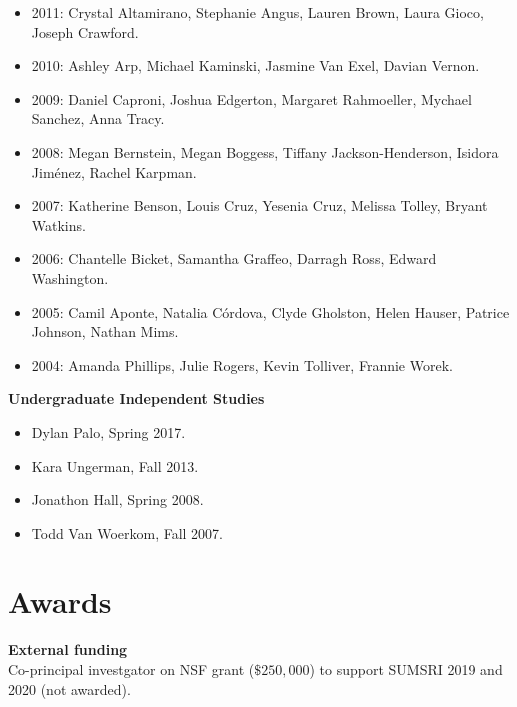 \documentclass[overlapped,line,letterpaper]{res}
\begin{document}
\begin{resume}
\begin{itemize}
\item
2011: Crystal Altamirano, Stephanie Angus, Lauren Brown, Laura Gioco, Joseph 
Crawford.

\item
2010: Ashley Arp, Michael Kaminski, Jasmine Van Exel, Davian Vernon.

\item
2009: Daniel Caproni, Joshua Edgerton, Margaret Rahmoeller, Mychael 
Sanchez, Anna Tracy. 

\item
2008: Megan Bernstein, Megan Boggess, Tiffany Jackson-Henderson, Isidora Jim\'{e}nez, Rachel Karpman.

\item
2007:  Katherine Benson, Louis Cruz, Yesenia Cruz, Melissa Tolley, Bryant Watkins.

\item
2006: Chantelle Bicket, Samantha Graffeo, Darragh Ross, Edward Washington.

\item
2005: Camil Aponte, Natalia C\'{o}rdova, Clyde Gholston, Helen Hauser, Patrice Johnson, Nathan Mims.

\item 
2004: Amanda Phillips, Julie Rogers, Kevin Tolliver, Frannie Worek.

\end{itemize}

{\bf  Undergraduate Independent Studies}

\begin{itemize}
\item
Dylan Palo, Spring 2017.

\item
Kara Ungerman, Fall 2013.

\item
Jonathon Hall, Spring 2008.

\item
Todd Van Woerkom, Fall 2007.
\end{itemize}


\large
\section{\bf Awards}
\normalsize
\vspace{3 mm}

{\bf External funding} \\
Co-principal investgator on NSF grant ($\$250,000$) to support SUMSRI 2019 and 2020 (not awarded).


\end{resume}
\end{document}
